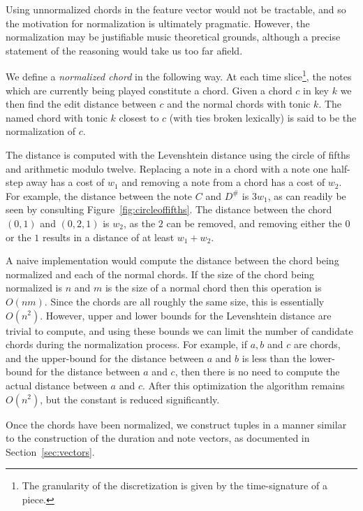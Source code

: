 \documentclass[twocolumn,dvipsnames]{article}
\begin{document}
Using unnormalized chords in the feature vector would not be tractable,
and so the motivation for normalization is ultimately pragmatic.
However, the normalization may be justifiable music theoretical grounds,
although a precise statement of the reasoning would take us too far afield.

We define a \textit{normalized chord} in the following way.
At each time slice\footnote{The granularity of the discretization is given by the time-signature of a piece.},
the notes which are currently being played constitute a chord.
Given a chord $c$ in key $k$ we then find the edit distance between $c$ and the normal chords with tonic $k$.
The named chord with tonic $k$ closest to $c$ (with ties broken lexically) is said to be the normalization of $c$.

The distance is computed with the Levenshtein distance using the circle of fifths and arithmetic modulo twelve.
Replacing a note in a chord with a note one half-step away has a cost of $w_1$ and removing a note from a chord has a cost of $w_2$.
For example, the distance between the note $C$ and $D^{\#}$ is $3w_1$,
as can readily be seen by consulting Figure~\ref{fig:circleoffifths}.
The distance between the chord $(0, 1)$ and $(0, 2, 1)$ is $w_2$, as the $2$ can be removed,
and removing either the $0$ or the $1$ results in a distance of at least $w_1 + w_2$.

A naive implementation would compute the distance between the chord being normalized and each of the normal chords.
If the size of the chord being normalized is $n$ and $m$ is the size of a normal chord then this operation is $O(nm)$.
Since the chords are all roughly the same size, this is essentially $O(n^2)$.
However, upper and lower bounds for the Levenshtein distance are trivial to compute,
and using these bounds we can limit the number of candidate chords during the normalization process.
For example, if $a, b$ and $c$ are chords, and the upper-bound for the distance between $a$ and $b$ is less than the lower-bound for the distance between $a$ and $c$, then there is no need to compute the actual distance between $a$ and $c$.
After this optimization the algorithm remains $O(n^2)$, but the constant is reduced significantly.

Once the chords have been normalized, we construct tuples in a manner similar to
the construction of the duration and note vectors, as documented in Section~\ref{sec:vectors}.
\end{document}
